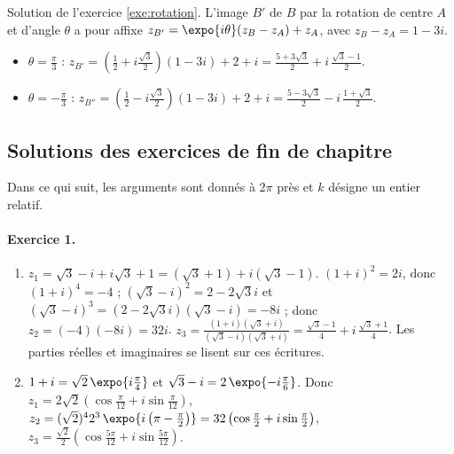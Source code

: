 \begin{corrige}
\begin{sol}
\end{sol}
\begin{sol}
Solution de l'exercice \ref{exe:rotation}.
L'image $B'$ de $B$ par la rotation de centre $A$ et d'angle $\theta$ a pour affixe $z_{B'} = \expo{i\theta}(z_B - z_A) + z_A$, avec $z_B - z_A = 1 - 3i$.
\begin{itemize}
\item $\theta = \frac{\pi}{3}$ : $z_{B'} = \left(\frac{1}{2} + i\frac{\sqrt{3}}{2}\right)(1 - 3i) + 2 + i
      = \boxed{\frac{5 + 3\sqrt{3}}{2} + i\,\frac{\sqrt{3} - 1}{2}}$.
\item $\theta = -\frac{\pi}{3}$ : $z_{B''} = \left(\frac{1}{2} - i\frac{\sqrt{3}}{2}\right)(1 - 3i) + 2 + i
      = \boxed{\frac{5 - 3\sqrt{3}}{2} - i\,\frac{1 + \sqrt{3}}{2}}$.
\end{itemize}
\end{sol}
\subsection*{Solutions des exercices de fin de chapitre}
Dans ce qui suit, les arguments sont donn\'es \`a $2\pi$ pr\`es et $k$ d\'esigne un entier relatif.

\paragraph{Exercice 1.}
\begin{enumerate}
\item $z_1 = \sqrt{3} - i + i\sqrt{3} + 1 = \boxed{(\sqrt{3}+1) + i(\sqrt{3}-1)}$.
      $(1+i)^2 = 2i$, donc $(1+i)^4 = -4$ ; $(\sqrt{3}-i)^2 = 2 - 2\sqrt{3}i$ et $(\sqrt{3}-i)^3 = (2-2\sqrt{3}i)(\sqrt{3}-i) = -8i$ ;
      donc $z_2 = (-4)(-8i) = \boxed{32i}$.
      $z_3 = \frac{(1+i)(\sqrt{3}+i)}{(\sqrt{3}-i)(\sqrt{3}+i)} = \boxed{\frac{\sqrt{3}-1}{4} + i\,\frac{\sqrt{3}+1}{4}}$.
      Les parties r\'eelles et imaginaires se lisent sur ces \'ecritures.
\item $1 + i = \sqrt{2}\,\expo{i\frac{\pi}{4}}$ et $\sqrt{3} - i = 2\,\expo{-i\frac{\pi}{6}}$. Donc
      $z_1 = 2\sqrt{2}\left(\cos\frac{\pi}{12} + i\sin\frac{\pi}{12}\right)$,
      $z_2 = (\sqrt{2})^4 2^3\,\expo{i\left(\pi - \frac{\pi}{2}\right)} = 32\left(\cos\frac{\pi}{2} + i\sin\frac{\pi}{2}\right)$,
      $z_3 = \frac{\sqrt{2}}{2}\left(\cos\frac{5\pi}{12} + i\sin\frac{5\pi}{12}\right)$.
\end{enumerate}


\end{corrige}
